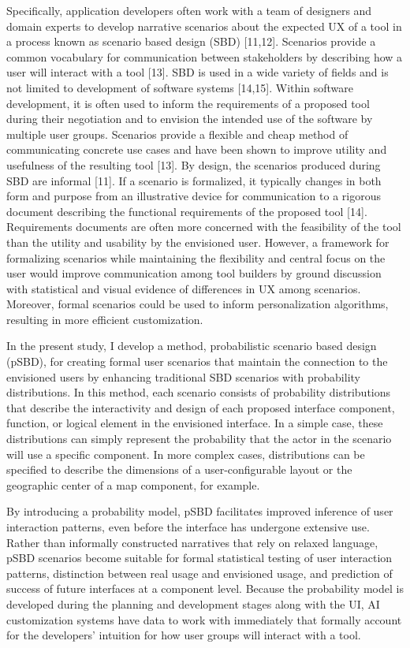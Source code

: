 \documentclass[]{article}
\begin{document}
Specifically, application developers often work with a team of designers
and domain experts to develop narrative scenarios about the expected UX
of a tool in a process known as scenario based design (SBD) {[}11,12{]}.
Scenarios provide a common vocabulary for communication between
stakeholders by describing how a user will interact with a tool
{[}13{]}. SBD is used in a wide variety of fields and is not limited to
development of software systems {[}14,15{]}. Within software
development, it is often used to inform the requirements of a proposed
tool during their negotiation and to envision the intended use of the
software by multiple user groups. Scenarios provide a flexible and cheap
method of communicating concrete use cases and have been shown to
improve utility and usefulness of the resulting tool {[}13{]}. By
design, the scenarios produced during SBD are informal {[}11{]}. If a
scenario is formalized, it typically changes in both form and purpose
from an illustrative device for communication to a rigorous document
describing the functional requirements of the proposed tool {[}14{]}.
Requirements documents are often more concerned with the feasibility of
the tool than the utility and usability by the envisioned user. However,
a framework for formalizing scenarios while maintaining the flexibility
and central focus on the user would improve communication among tool
builders by ground discussion with statistical and visual evidence of
differences in UX among scenarios. Moreover, formal scenarios could be
used to inform personalization algorithms, resulting in more efficient
customization.

In the present study, I develop a method, probabilistic scenario based
design (pSBD), for creating formal user scenarios that maintain the
connection to the envisioned users by enhancing traditional SBD
scenarios with probability distributions. In this method, each scenario
consists of probability distributions that describe the interactivity
and design of each proposed interface component, function, or logical
element in the envisioned interface. In a simple case, these
distributions can simply represent the probability that the actor in the
scenario will use a specific component. In more complex cases,
distributions can be specified to describe the dimensions of a
user-configurable layout or the geographic center of a map component,
for example.

By introducing a probability model, pSBD facilitates improved inference
of user interaction patterns, even before the interface has undergone
extensive use. Rather than informally constructed narratives that rely
on relaxed language, pSBD scenarios become suitable for formal
statistical testing of user interaction patterns, distinction between
real usage and envisioned usage, and prediction of success of future
interfaces at a component level. Because the probability model is
developed during the planning and development stages along with the UI,
AI customization systems have data to work with immediately that
formally account for the developers' intuition for how user groups will
interact with a tool.
\end{document}
